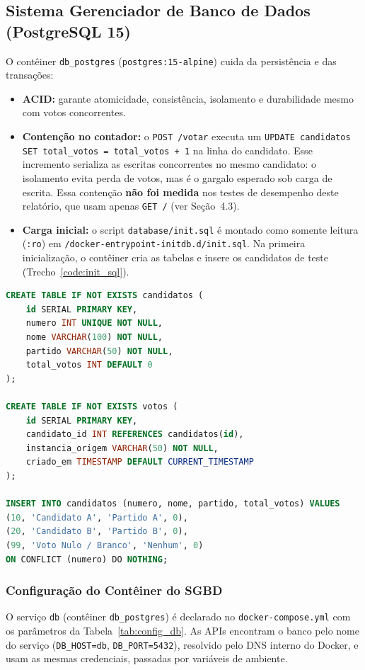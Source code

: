 \documentclass[12pt,a4paper]{article}
\begin{document}
\subsection{Sistema Gerenciador de Banco de Dados (PostgreSQL 15)}
O contêiner \texttt{db\_postgres} (\texttt{postgres:15-alpine}) cuida da persistência e das transações:
\begin{itemize}
    \item \textbf{ACID:} garante atomicidade, consistência, isolamento e durabilidade mesmo com votos concorrentes.
    \item \textbf{Contenção no contador:} o \texttt{POST /votar} executa um \texttt{UPDATE candidatos SET total\_votos = total\_votos + 1} na linha do candidato. Esse incremento serializa as escritas concorrentes no mesmo candidato: o isolamento evita perda de votos, mas é o gargalo esperado sob carga de escrita. Essa contenção \textbf{não foi medida} nos testes de desempenho deste relatório, que usam apenas \texttt{GET /} (ver Seção~4.3).
    \item \textbf{Carga inicial:} o script \texttt{database/init.sql} é montado como somente leitura (\texttt{:ro}) em \texttt{/docker-entrypoint-initdb.d/init.sql}. Na primeira inicialização, o contêiner cria as tabelas e insere os candidatos de teste (Trecho~\ref{code:init_sql}).
\end{itemize}

\begin{lstlisting}[language=SQL, caption={Inicialização do banco de dados (\texttt{database/init.sql})}, label={code:init_sql}]
CREATE TABLE IF NOT EXISTS candidatos (
    id SERIAL PRIMARY KEY,
    numero INT UNIQUE NOT NULL,
    nome VARCHAR(100) NOT NULL,
    partido VARCHAR(50) NOT NULL,
    total_votos INT DEFAULT 0
);

CREATE TABLE IF NOT EXISTS votos (
    id SERIAL PRIMARY KEY,
    candidato_id INT REFERENCES candidatos(id),
    instancia_origem VARCHAR(50) NOT NULL,
    criado_em TIMESTAMP DEFAULT CURRENT_TIMESTAMP
);

INSERT INTO candidatos (numero, nome, partido, total_votos) VALUES
(10, 'Candidato A', 'Partido A', 0),
(20, 'Candidato B', 'Partido B', 0),
(99, 'Voto Nulo / Branco', 'Nenhum', 0)
ON CONFLICT (numero) DO NOTHING;
\end{lstlisting}

\subsubsection{Configuração do Contêiner do SGBD}
O serviço \texttt{db} (contêiner \texttt{db\_postgres}) é declarado no \texttt{docker-compose.yml} com os parâmetros da Tabela~\ref{tab:config_db}. As APIs encontram o banco pelo nome do serviço (\texttt{DB\_HOST=db}, \texttt{DB\_PORT=5432}), resolvido pelo DNS interno do Docker, e usam as mesmas credenciais, passadas por variáveis de ambiente.
\end{document}
